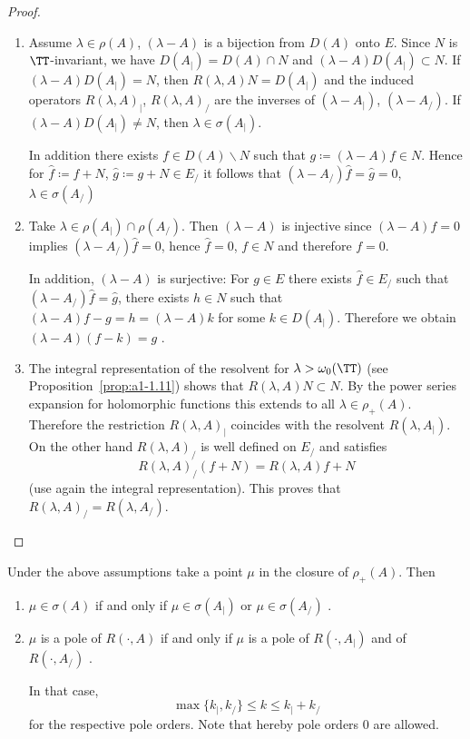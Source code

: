 \begin{proof}
\begin{enumerate}[\upshape (i), wide, labelindent=.25em]
\item 
Assume $\lambda \in \rho(A)$, \ie $(\lambda-A)$ is a bijection from $D(A)$ onto $E$.
Since $N$ is $\TT$-invariant, we have $D(A_{|}) = D(A) \cap N$ and $(\lambda-A)D(A_{|}) \subset N$.
If\/ $(\lambda-A)D(A_{|}) = N$, then $R(\lambda,A)N = D(A_{|})$ and the induced operators $R(\lambda,A)_{|}$, \resp $R(\lambda,A)_{/}$ are the inverses of\/ $(\lambda-A_{|})$, \resp $(\lambda-A_{/})$.
If\/ $(\lambda-A)D(A_{|}) \neq N$, then $\lambda \in \sigma(A_{|})$.

In addition there exists $f \in D(A)\backslash N$ such that $g \coloneqq (\lambda-A)f \in N$.
Hence for $\hat{f} \coloneqq f+N$, $\hat{g} \coloneqq g+N \in E_{/}$ it follows that $(\lambda-A_{/})\hat{f} = \hat{g} = 0$, \ie $\lambda \in \sigma(A_{/})$

\item 
Take $\lambda \in \rho(A_{|}) \cap \rho(A_{/})$.
Then $(\lambda-A)$ is injective since $(\lambda-A)f = 0$ implies $(\lambda-A_{/})\hat{f}= 0$, hence $\hat{f} = 0$, \ie $f \in N$ and therefore $f = 0$.

In addition, $(\lambda-A)$ is surjective: For $g \in E$ there exists $\hat{f} \in E_{/}$ such that $(\lambda-A_{/})\hat{f} = \hat{g}$, \ie there exists $h \in N$ such that $(\lambda-A)f - g = h = (\lambda-A)k$ for some $k \in D(A_{|})$.
Therefore we obtain $(\lambda-A)(f-k) = g$ .

\item 
The integral representation of the resolvent for $\lambda > \omega_{0}(\TT)$ (see Proposition~\ref{prop:a1-1.11}) shows that $R(\lambda,A)N \subset N$.
By the power series expansion for holomorphic functions this extends to all $\lambda \in \rho_{+}(A)$.
Therefore the restriction $R(\lambda,A)_{|}$ coincides with the resolvent $R(\lambda,A_{|})$.
On the other hand $R(\lambda,A)_{/}$ is well defined on $E_{/}$ and satisfies
\[
R(\lambda,A)_{/}(f+N) = R(\lambda,A)f + N
\]
(use again the integral representation).
This proves that $R(\lambda,A)_{/} = R(\lambda,A_{/})$.
\qedhere
\end{enumerate}
\end{proof}
\begin{corollary}\label{cor:a3-4.3}
Under the above assumptions take a point $\mu$ in the closure of\/ $\rho_{+}(A)$.
Then
\begin{enumerate}[\upshape (i)]
\item 
$\mu \in \sigma(A)$ if and only if\/ $\mu \in \sigma(A_{|})$ or $\mu \in \sigma(A_{/})$ .

\item 
$\mu$ is a pole of\/ $R(\cdot,A)$ if and only if\/ $\mu$ is a pole of\/ $R(\cdot,A_{|})$ and of\/ $R(\cdot,A_{/})$ .

In that case,
\[
\max\{k_{|},k_{/}\} \leq k \leq k_{|} + k_{/}
\]
for the respective pole orders. Note that hereby pole orders $0$ are allowed.
\end{enumerate}
\end{corollary}
